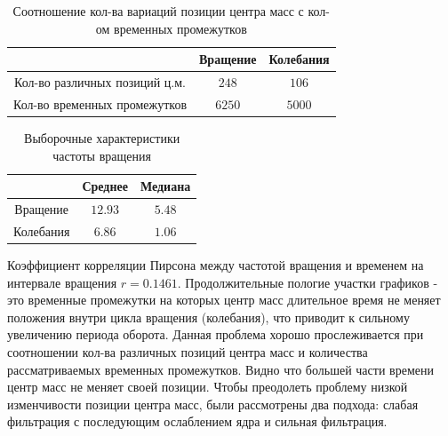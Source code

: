 \documentclass[a4paper,12pt]{article} %
\begin{document}
	\begin{table}[H]
		\caption{Соотношение кол-ва вариаций позиции центра масс с кол-ом временных промежутков}
		\label{tab:my_label1}
		\begin{center}
			\vspace{5mm}
			\begin{tabular}{|c|c|c|}
				\hline
				 & Вращение & Колебания\\
				\hline
				Кол-во различных позиций ц.м. & $ 248 $ & $ 106 $\\
				\hline
				Кол-во временных промежутков & $ 6250 $ & $ 5000 $\\
				\hline
			\end{tabular}
		\end{center}
	\end{table}
	
	\begin{table}[H]
		\caption{Выборочные характеристики частоты вращения}
		\label{tab:my_label2}
		\begin{center}
			\vspace{5mm}
			\begin{tabular}{|c|c|c|}
				\hline
				& Среднее & Медиана\\
				\hline
				Вращение & $ 12.93 $ & $ 5.48 $\\
				\hline
				Колебания & $ 6.86 $ & $ 1.06 $\\
				\hline
			\end{tabular}
		\end{center}
	\end{table}

	Коэффициент корреляции Пирсона между частотой вращения и временем на интервале вращения $r = 0.1461$.
	\newline Продолжительные пологие участки графиков - это временные промежутки на которых центр масс длительное время не меняет положения внутри цикла вращения (колебания), что приводит к сильному увеличению периода оборота. Данная проблема хорошо прослеживается при соотношении кол-ва различных позиций центра масс и количества рассматриваемых временных промежутков. Видно что большей части времени центр масс не меняет своей позиции.
	\newline Чтобы преодолеть проблему низкой изменчивости позиции центра масс, были рассмотрены два подхода: слабая фильтрация с последующим ослаблением ядра и сильная фильтрация.
	
\end{document}
